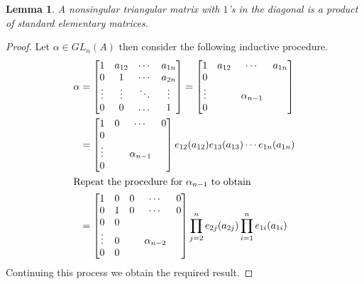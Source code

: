 \documentclass[12pt]{article}
\numberwithin{equation}{section}
\newcounter{dummy} \numberwithin{dummy}{section}
\newtheorem{lemma}[dummy]{Lemma}
\begin{document}
	\begin{lemma}\label{diag1andprodelementary}
		A nonsingular triangular matrix with $1$'s in the diagonal is a product of standard elementary matrices.
	\end{lemma}
	\begin{proof}
		Let $\alpha \in GL_n(A)$ then consider the following inductive procedure.
		\begin{align*}
			\alpha&= \begin{bmatrix}
				1 & a_{12} &\cdots &a_{1n}\\
				0& 1 & \cdots &a_{2n}\\
				\vdots & \vdots  & \ddots  & \vdots \\
				0 & 0 & \dots & 1
			\end{bmatrix}
			= \begin{bmatrix}
				1 & a_{12} &\cdots &a_{1n}\\
				0&  &   &\\
				\vdots &  & \alpha_{n-1}  &  \\
				0 &  & & 
			\end{bmatrix}\\
			&=\begin{bmatrix}
				1 & 0 &\cdots &0\\
				0&  &   &\\
				\vdots &  & \alpha_{n-1}  &  \\
				0 &  & & 
			\end{bmatrix} e_{12}(a_{12}) e_{13}(a_{13}) \cdots e_{1n}(a_{1n})\\
			\intertext{Repeat the procedure for $\alpha_{n-1}$ to obtain}
			&= \begin{bmatrix}
				1 & 0 & 0 & \cdots & 0 \\
				0 & 1 & 0 & \cdots & 0\\
				0 & 0 &   &  &\\
				\vdots & 0 &   &\alpha_{n-2}  &\\
				0 & 0 &   &  &
			\end{bmatrix}\prod_{j=2}^n e_{2j}(a_{2j}) \prod_{i=1}^n e_{1i} (a_{1i})
		\end{align*}
		Continuing this process we obtain the required result.
	\end{proof}
	
\end{document}
